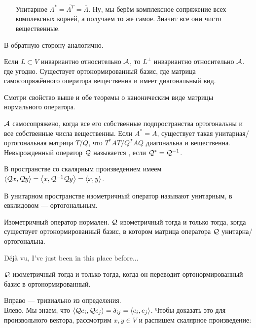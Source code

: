 \documentclass{article}
\begin{document}
\begin{itemize}
\begin{Proof}
\begin{itemize}
                \item[Унитарное] $\Lambda^*=\overline{\Lambda^T}=\overline{\Lambda}$. Ну, мы берём комплексное сопряжение всех комплексных корней, а получаем то же самое. Значит все они чисто вещественные.
            \end{itemize}
            В обратную сторону аналогично.
        \end{Proof}
        \thm Если $L\subset V$ инвариантно относительно ${\mathcal{A}}$, то $L^\perp$ инвариантно относительно ${\mathcal{A}}$.
        \thm {} где угодно. Существует ортонормированный базис, где матрица самосопряжённого оператора вещественна и имеет диагональный вид.
        \begin{Proof}
            Смотри свойство выше и обе теоремы о каноническим виде матрицы нормального оператора.
        \end{Proof}
        \thm ${\mathcal{A}}$ самосопряжено, когда все его собственные подпространства ортогональны и все собственные числа вещественны.
        \thm Если $A^*=A$, существует такая унитарная/ортогональная матрица $T$/$Q$, что $T^*AT$/$Q^TAQ$ диагональна и вещественна.
        \dfn Невырожденный оператор ${\mathcal{Q}}$ называется , если ${\mathcal{Q}}^*={\mathcal{Q}}^{-1}$.
        \begin{Comment}
            В пространстве со скалярным произведением имеем ${\left\langle{{\mathcal{Q}}x},{{\mathcal{Q}} y}\right\rangle}={\left\langle{x},{{\mathcal{Q}}^{-1}{\mathcal{Q}} y}\right\rangle}={\left\langle{x},{y}\right\rangle}$.
        \end{Comment}
        \begin{Comment}
            В унитарном пространстве изометричный оператор называют унитарным, в евклидовом --- ортогональным.
        \end{Comment}
        \thm Изометричный оператор нормален.
        \thm ${\mathcal{Q}}$ изометричный тогда и только тогда, когда существует ортонормированный базис, в котором матрица оператора ${\mathcal{Q}}$ унитарна/ортогональна.
        \begin{Proof}
            D\'{e}j\`{a} vu, I've just been in this place before...
        \end{Proof}
        \thm ${\mathcal{Q}}$ изометричный тогда и только тогда, когда он переводит ортонормированный базис в ортонормированный.
        \begin{Proof}
            Вправо --- тривиально из определения.\\
            Влево. Мы знаем, что ${\left\langle{{\mathcal{Q}}e_i},{{\mathcal{Q}} e_j}\right\rangle}=\delta_{ij}={\left\langle{e_i},{e_j}\right\rangle}$. Чтобы доказать это для произвольного вектора, рассмотрим $x,y\in V$ и распишем скалярное произведение:

\end{Proof}
\end{itemize}
\end{document}
